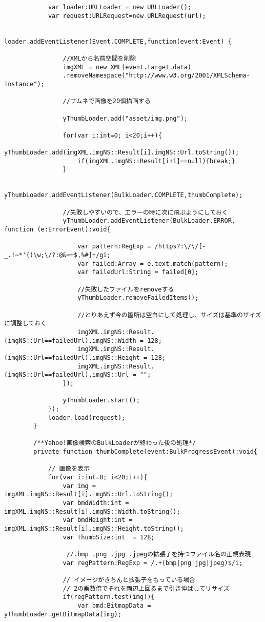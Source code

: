 {\begin{verbatim}
			var loader:URLLoader = new URLLoader();
			var request:URLRequest=new URLRequest(url);
			
			loader.addEventListener(Event.COMPLETE,function(event:Event) {
									
				//XMLから名前空間を削除
				imgXML = new XML(event.target.data)
				.removeNamespace("http://www.w3.org/2001/XMLSchema-instance");
				
				//サムネで画像を20個描画する
				
				yThumbLoader.add("asset/img.png");
				
				for(var i:int=0; i<20;i++){
					yThumbLoader.add(imgXML.imgNS::Result[i].imgNS::Url.toString());
					if(imgXML.imgNS::Result[i+1]==null){break;}
				}
				
				yThumbLoader.addEventListener(BulkLoader.COMPLETE,thumbComplete);
				
				//失敗しやすいので、エラーの時に次に飛ぶようにしておく
				yThumbLoader.addEventListener(BulkLoader.ERROR, function (e:ErrorEvent):void{
					
					var pattern:RegExp = /https?:\/\/[-_.!~*'()\w;\/?:@&=+$,%#]+/gi;
					var failed:Array = e.text.match(pattern);
					var failedUrl:String = failed[0];
					
					//失敗したファイルをremoveする
					yThumbLoader.removeFailedItems();
					
					//とりあえず今の箇所は空白にして処理し、サイズは基準のサイズに調整しておく
					imgXML.imgNS::Result.(imgNS::Url==failedUrl).imgNS::Width = 128;
					imgXML.imgNS::Result.(imgNS::Url==failedUrl).imgNS::Height = 128;
					imgXML.imgNS::Result.(imgNS::Url==failedUrl).imgNS::Url = "";
				});
				
				yThumbLoader.start();
			});
			loader.load(request);
		}
		
		/**Yahoo!画像検索のBulkLoaderが終わった後の処理*/
		private function thumbComplete(event:BulkProgressEvent):void{
					
			// 画像を表示
			for(var i:int=0; i<20;i++){
				var img = imgXML.imgNS::Result[i].imgNS::Url.toString(); 
				var bmdWidth:int = imgXML.imgNS::Result[i].imgNS::Width.toString();
				var bmdHeight:int = imgXML.imgNS::Result[i].imgNS::Height.toString();
				var thumbSize:int  = 128;
				
				 //.bmp .png .jpg .jpegの拡張子を持つファイル名の正規表現
				var regPattern:RegExp = /.+(bmp|png|jpg|jpeg)$/i;
				
				// イメージがきちんと拡張子をもっている場合
				// 2の乗数倍でそれを両辺上回るまで引き伸ばしてリサイズ
				if(regPattern.test(img)){
					var bmd:BitmapData = yThumbLoader.getBitmapData(img);
					

\end{verbatim}}
